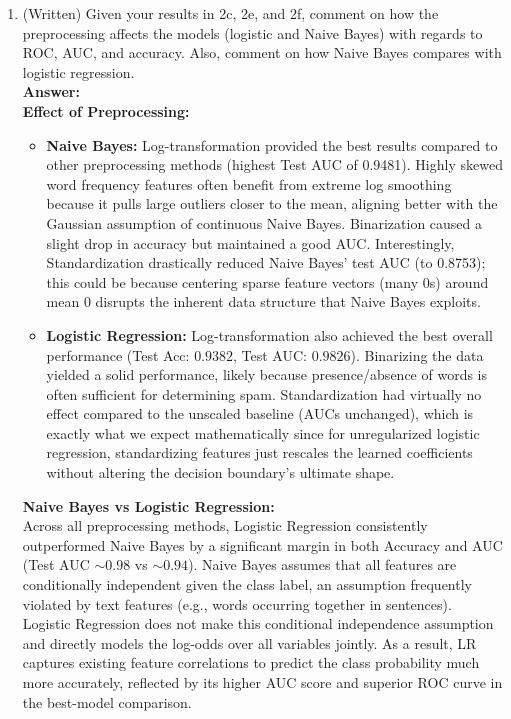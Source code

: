 \documentclass[a4paper,12pt]{article}
\begin{document}
\begin{enumerate}
\begin{enumerate}
        \item[(g)] (Written) Given your results in 2c, 2e, and 2f, comment on how the preprocessing affects the models (logistic and Naive Bayes) with regards to ROC, AUC, and accuracy. Also, comment on how Naive Bayes compares with logistic regression. \\
        \textbf{Answer:} \\
        \textbf{Effect of Preprocessing:}
        \begin{itemize}
            \item \textbf{Naive Bayes:} Log-transformation provided the best results compared to other preprocessing methods (highest Test AUC of 0.9481). Highly skewed word frequency features often benefit from extreme log smoothing because it pulls large outliers closer to the mean, aligning better with the Gaussian assumption of continuous Naive Bayes. Binarization caused a slight drop in accuracy but maintained a good AUC. Interestingly, Standardization drastically reduced Naive Bayes' test AUC (to 0.8753); this could be because centering sparse feature vectors (many 0s) around mean 0 disrupts the inherent data structure that Naive Bayes exploits.
            \item \textbf{Logistic Regression:} Log-transformation also achieved the best overall performance (Test Acc: $0.9382$, Test AUC: $0.9826$). Binarizing the data yielded a solid performance, likely because presence/absence of words is often sufficient for determining spam. Standardization had virtually no effect compared to the unscaled baseline (AUCs unchanged), which is exactly what we expect mathematically since for unregularized logistic regression, standardizing features just rescales the learned coefficients without altering the decision boundary's ultimate shape.
        \end{itemize}
        
        \textbf{Naive Bayes vs Logistic Regression:} \\
        Across all preprocessing methods, Logistic Regression consistently outperformed Naive Bayes by a significant margin in both Accuracy and AUC (Test AUC $\sim 0.98$ vs $\sim 0.94$). Naive Bayes assumes that all features are conditionally independent given the class label, an assumption frequently violated by text features (e.g., words occurring together in sentences). Logistic Regression does not make this conditional independence assumption and directly models the log-odds over all variables jointly. As a result, LR captures existing feature correlations to predict the class probability much more accurately, reflected by its higher AUC score and superior ROC curve in the best-model comparison.
    \end{enumerate}


\end{enumerate}
\end{document}
